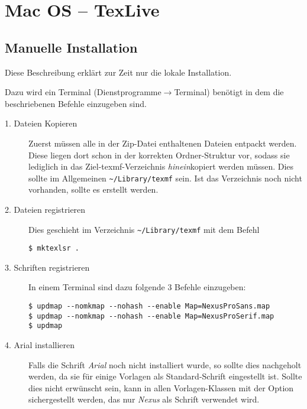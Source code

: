 \clearpage
\section{Mac OS -- TexLive}%

\subsection{Manuelle Installation}

Diese Beschreibung erklärt zur Zeit nur die lokale Installation.

Dazu wird ein Terminal {\sffamily(Dienstprogramme$\to$Terminal)}
benötigt in dem die beschriebenen Befehle einzugeben sind.

\begin{description}
  \item[1. Dateien Kopieren] Zuerst müssen alle in der Zip-Datei enthaltenen
    Dateien entpackt werden.
    Diese liegen dort schon in der korrekten Ordner-Struktur vor, sodass
    sie lediglich in das Ziel-texmf-Verzeichnis \emph{hinein}kopiert werden
    müssen.
    Dies sollte im Allgemeinen \lstinline{~/Library/texmf} sein.
    Ist das Verzeichnis noch nicht vorhanden, sollte es erstellt werden.

  \item[2. Dateien registrieren]
    Dies geschieht im Verzeichnis \lstinline{~/Library/texmf} mit dem Befehl
    \begin{lstlisting}[style=cmd]
$ mktexlsr .
    \end{lstlisting}

  \item[3. Schriften registrieren]
    In einem Terminal sind dazu folgende 3 Befehle einzugeben:
    \begin{lstlisting}[style=cmd]
$ updmap --nomkmap --nohash --enable Map=NexusProSans.map
$ updmap --nomkmap --nohash --enable Map=NexusProSerif.map
$ updmap
    \end{lstlisting}


  \item[4. Arial installieren]
    Falls die Schrift \emph{Arial} noch nicht installiert wurde, so sollte dies
    nachgeholt werden, da sie für einige Vorlagen als Standard-Schrift
    eingestellt ist. Sollte dies nicht erwünscht sein, kann in allen
    Vorlagen-Klassen mit der Option  sichergestellt werden,
    das nur \emph{Nexus} als Schrift verwendet wird.
    

\end{description}
